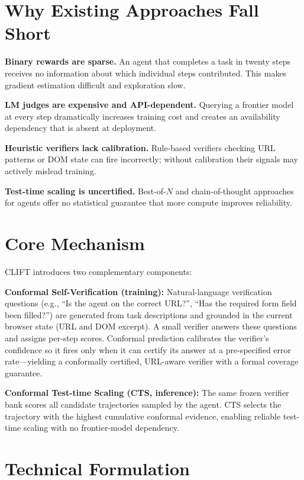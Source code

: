 \documentclass[10pt,twocolumn]{article}
\begin{document}
\section{Why Existing Approaches Fall Short}

\textbf{Binary rewards are sparse.} An agent that completes a task in twenty
steps receives no information about which individual steps contributed. This
makes gradient estimation difficult and exploration slow.

\textbf{LM judges are expensive and API-dependent.} Querying a frontier model
at every step dramatically increases training cost and creates an availability
dependency that is absent at deployment.

\textbf{Heuristic verifiers lack calibration.} Rule-based verifiers checking
URL patterns or DOM state can fire incorrectly; without calibration their
signals may actively mislead training.

\textbf{Test-time scaling is uncertified.} Best-of-$N$ and chain-of-thought
approaches for agents offer no statistical guarantee that more compute
improves reliability.

\section{Core Mechanism}

CLIFT introduces two complementary components:

\textbf{Conformal Self-Verification (training):} Natural-language verification
questions (e.g., ``Is the agent on the correct URL?'', ``Has the required
form field been filled?'') are generated from task descriptions and grounded
in the current browser state (URL and DOM excerpt). A small verifier answers
these questions and assigns per-step scores. Conformal prediction calibrates
the verifier's confidence so it fires only when it can certify its answer at
a pre-specified error rate---yielding a conformally certified, URL-aware
verifier with a formal coverage guarantee.

\textbf{Conformal Test-time Scaling (CTS, inference):} The same frozen
verifier bank scores all candidate trajectories sampled by the agent. CTS
selects the trajectory with the highest cumulative conformal evidence,
enabling reliable test-time scaling with no frontier-model dependency.

\section{Technical Formulation}
\end{document}
